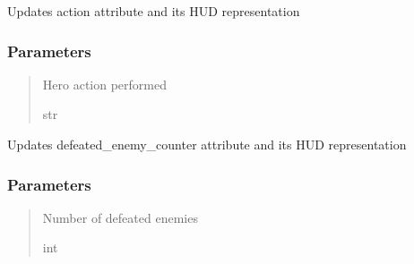 \documentclass[letterpaper,10pt,english]{sphinxmanual}
\begin{document}
\begin{fulllineitems}
\begin{fulllineitems}
\label{\detokenize{api_reference/dungeon_gui/hud:hud.HUD.update_action}}
\pysigstartsignatures
{}
\pysigstopsignatures
\sphinxAtStartPar
Updates action attribute and its HUD representation


\subsubsection{Parameters}
\label{\detokenize{api_reference/dungeon_gui/hud:id2}}\begin{quote}\begin{description}
\sphinxAtStartPar
Hero action performed

\sphinxAtStartPar
str

\end{description}\end{quote}

\end{fulllineitems}


\begin{fulllineitems}
\label{\detokenize{api_reference/dungeon_gui/hud:hud.HUD.update_defeated_enemy_counter}}
\pysigstartsignatures
{}
\pysigstopsignatures
\sphinxAtStartPar
Updates defeated\_enemy\_counter attribute and its HUD representation


\subsubsection{Parameters}
\label{\detokenize{api_reference/dungeon_gui/hud:id3}}\begin{quote}\begin{description}
\sphinxAtStartPar
Number of defeated enemies

\sphinxAtStartPar
int

\end{description}\end{quote}


\end{fulllineitems}
\end{fulllineitems}
\end{document}
